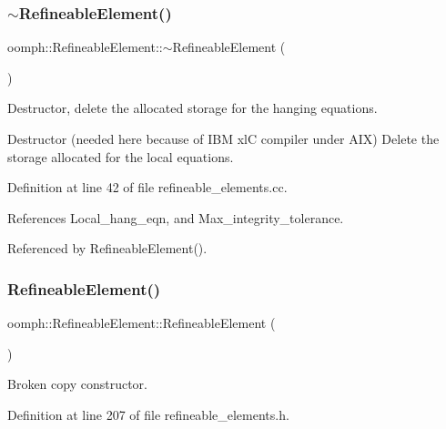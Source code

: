 \subsubsection{\texorpdfstring{$\sim$\+Refineable\+Element()}{~RefineableElement()}}
{\footnotesize\ttfamily oomph\+::\+Refineable\+Element\+::$\sim$\+Refineable\+Element (\begin{DoxyParamCaption}{ }\end{DoxyParamCaption})\hspace{0.3cm}{\ttfamily [virtual]}}



Destructor, delete the allocated storage for the hanging equations. 

Destructor (needed here because of I\+BM xlC compiler under A\+IX) Delete the storage allocated for the local equations. 

Definition at line 42 of file refineable\+\_\+elements.\+cc.



References Local\+\_\+hang\+\_\+eqn, and Max\+\_\+integrity\+\_\+tolerance.



Referenced by Refineable\+Element().

\mbox{\label{classoomph_1_1RefineableElement_ac0720a20f0d462ee3d1e6681cc9995ac}} 
\subsubsection{\texorpdfstring{Refineable\+Element()}{RefineableElement()}\hspace{0.1cm}{\footnotesize\ttfamily [2/2]}}
{\footnotesize\ttfamily oomph\+::\+Refineable\+Element\+::\+Refineable\+Element (\begin{DoxyParamCaption}\item[{const \hyperlink{classoomph_1_1RefineableElement}{Refineable\+Element} \&}]{ }\end{DoxyParamCaption})\hspace{0.3cm}{\ttfamily [inline]}}



Broken copy constructor. 



Definition at line 207 of file refineable\+\_\+elements.\+h.



